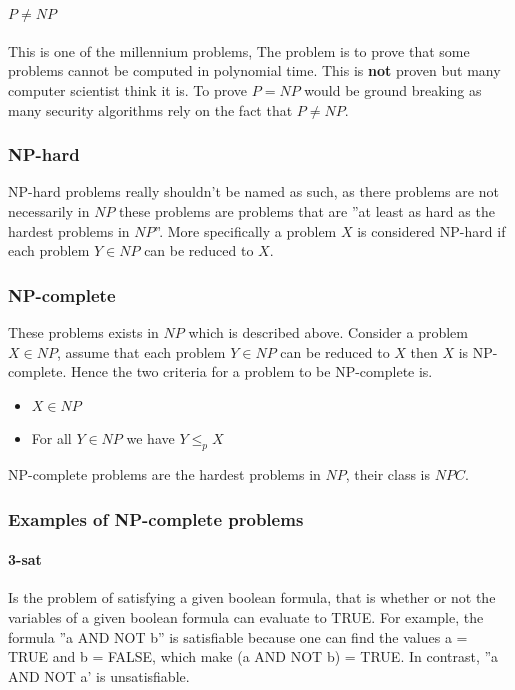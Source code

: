 \documentclass[12pt]{article} %
\begin{document}
\paragraph{$P \neq NP$}
This is one of the millennium problems, The problem is to prove that some problems cannot be computed in polynomial time. This is \textbf{not} proven but many computer scientist think it is. To prove $P = NP$ would be ground breaking as many security algorithms rely on the fact that $P \neq NP$.

\subsubsection{NP-hard}
NP-hard problems really shouldn't be named as such, as there problems are not necessarily in $NP$ these problems are problems that are ''at least as hard as the hardest problems in $NP$''. More specifically a problem $X$ is considered NP-hard if each problem $Y \in NP$ can be reduced to $X$.

\subsubsection{NP-complete}
These problems exists in $NP$ which is described above. Consider a problem $X \in NP$, assume that each problem $Y \in NP$ can be reduced to $X$ then $X$ is NP-complete. Hence the two criteria for a problem to be NP-complete is.
\begin{itemize}
    \item $X \in NP$
    \item For all $Y \in NP$ we have $Y \leq_{p} X$
\end{itemize}
NP-complete problems are the hardest problems in $NP$, their class is $NPC$.

\subsubsection{Examples of NP-complete problems}

\paragraph{3-sat}
Is the problem of satisfying a given boolean formula, that is whether or not the variables of a given boolean formula can evaluate to TRUE. For example, the formula ''a AND NOT b'' is satisfiable because one can find the values a = TRUE and b = FALSE, which make (a AND NOT b) = TRUE. In contrast, ''a AND NOT a' is unsatisfiable.
\end{document}
